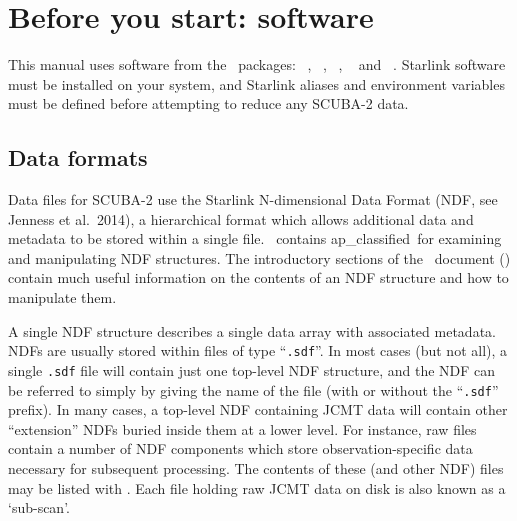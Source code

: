 \section{Before you start: software}

This manual uses software from the \starlink\ packages: \smurf\
\cite{smurf}, \Kappa\ \cite{kappa}, \gaia\ \cite{gaia}, \oracdr\
\cite{oracdr} and \picard\ \cite{picard}. Starlink software must be
installed on your system, and Starlink aliases and environment
variables must be defined before attempting to reduce any SCUBA-2
data.

\subsection{Data formats}
\label{sec:ndf}

Data files for SCUBA-2 use the Starlink N-dimensional Data Format (NDF,
see Jenness et al.\ 2014\cite{ndf}), a hierarchical format which allows
additional data and metadata to be stored within a single file. \Kappa\
contains  {ap_classified}\ for examining and
manipulating NDF structures. The introductory sections of the \Kappa\
document () contain much useful information on
the contents of an NDF structure and how to manipulate them.

A single NDF structure describes a single data array with associated
metadata. NDFs are usually stored within files of type ``\verb+.sdf+''.
In most cases (but not all), a single \verb+.sdf+ file will contain just
one top-level NDF structure, and the NDF can be referred to simply by
giving the name of the file (with or without the ``\verb+.sdf+'' prefix).
In many cases, a top-level NDF containing JCMT data will contain other
``extension'' NDFs buried inside them at a lower level. For instance, raw
files contain a number of NDF components which store observation-specific
data necessary for subsequent processing. The contents of these (and
other NDF) files may be listed with \HDSTRACEref. Each file holding raw
JCMT data on disk is also known as a `sub-scan'.


